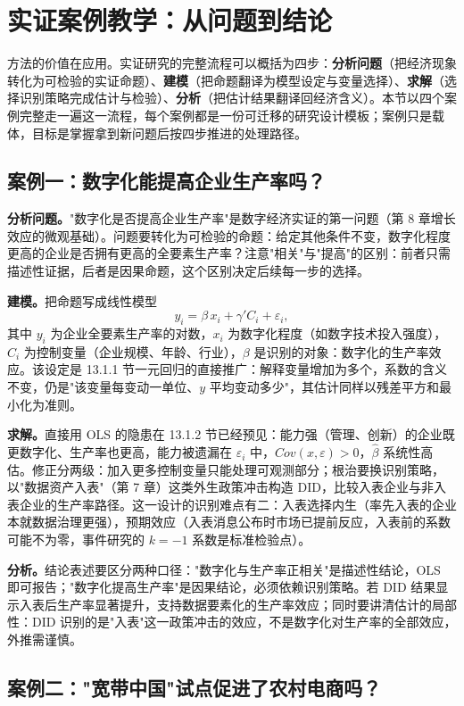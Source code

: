 \section{实证案例教学：从问题到结论}

方法的价值在应用。实证研究的完整流程可以概括为四步：\textbf{分析问题}（把经济现象转化为可检验的实证命题）、\textbf{建模}（把命题翻译为模型设定与变量选择）、\textbf{求解}（选择识别策略完成估计与检验）、\textbf{分析}（把估计结果翻译回经济含义）。本节以四个案例完整走一遍这一流程，每个案例都是一份可迁移的研究设计模板；案例只是载体，目标是掌握拿到新问题后按四步推进的处理路径。

\subsection{案例一：数字化能提高企业生产率吗？}

\textbf{分析问题。}"数字化是否提高企业生产率"是数字经济实证的第一问题（第 8 章增长效应的微观基础）。问题要转化为可检验的命题：给定其他条件不变，数字化程度更高的企业是否拥有更高的全要素生产率？注意"相关"与"提高"的区别：前者只需描述性证据，后者是因果命题，这个区别决定后续每一步的选择。

\textbf{建模。}把命题写成线性模型
\[
y_i = \beta\, x_i + \gamma' C_i + \varepsilon_i,
\]
其中 $y_i$ 为企业全要素生产率的对数，$x_i$ 为数字化程度（如数字技术投入强度），$C_i$ 为控制变量（企业规模、年龄、行业），$\beta$ 是识别的对象：数字化的生产率效应。该设定是 13.1.1 节一元回归的直接推广：解释变量增加为多个，系数的含义不变，仍是"该变量每变动一单位、$y$ 平均变动多少"，其估计同样以残差平方和最小化为准则。

\textbf{求解。}直接用 OLS 的隐患在 13.1.2 节已经预见：能力强（管理、创新）的企业既更数字化、生产率也更高，能力被遗漏在 $\varepsilon_i$ 中，$Cov(x, \varepsilon) > 0$，$\hat\beta$ 系统性高估。修正分两级：加入更多控制变量只能处理可观测部分；根治要换识别策略，以"数据资产入表"（第 7 章）这类外生政策冲击构造 DID，比较入表企业与非入表企业的生产率路径。这一设计的识别难点有二：入表选择内生（率先入表的企业本就数据治理更强），预期效应（入表消息公布时市场已提前反应，入表前的系数可能不为零，事件研究的 $k = -1$ 系数是标准检验点）。

\textbf{分析。}结论表述要区分两种口径："数字化与生产率正相关"是描述性结论，OLS 即可报告；"数字化提高生产率"是因果结论，必须依赖识别策略。若 DID 结果显示入表后生产率显著提升，支持数据要素化的生产率效应；同时要讲清估计的局部性：DID 识别的是"入表"这一政策冲击的效应，不是数字化对生产率的全部效应，外推需谨慎。

\subsection{案例二："宽带中国"试点促进了农村电商吗？}

